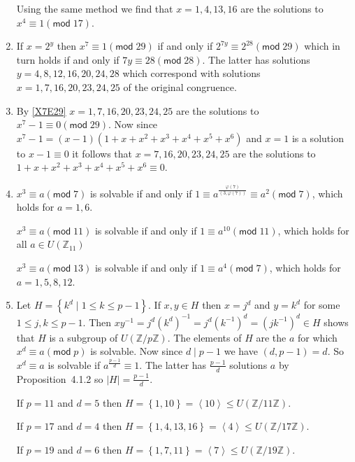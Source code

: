 \documentclass[12pt]{article}
\renewcommand{\pmod}[1]{\left(\mathsf{mod}\;#1\right)}
\begin{document}
\begin{enumerate}
Using the same method we find that $x=1,4,13,16$ are the solutions
to $x^4\equiv 1\pmod{17}$.

\item\label{X7E29} %
If $x=2^y$ then $x^7\equiv 1\pmod{29}$ if and only
if $2^{7y}\equiv 2^{28}\pmod{29}$ which in turn holds
if and only if $7y\equiv 28\pmod{28}$. The latter has solutions
$y=4,8,12,16,20,24,28$ which correspond with solutions
$x=1,7,16,20,23,24,25$ of the original congruence.

\item %
By \autoref{X7E29}
$x=1,7,16,20,23,24,25$ are the solutions to $x^7-1\equiv 0\pmod{29}$.
Now since $x^7-1=\left(x-1\right)\left(1+x+x^2+x^3+x^4+x^5+x^6\right)$
and $x=1$ is a solution to $x-1\equiv 0$ it follows that
$x=7,16,20,23,24,25$ are the solutions to 
$1+x+x^2+x^3+x^4+x^5+x^6\equiv 0$.

\item %
$x^3\equiv a\pmod{7}$ is solvable if and only if
$1\equiv a^{\frac{\varphi\left(7\right)}
{\left(3,\varphi\left(7\right)\right)}}
\equiv a^2\pmod{7}$, which holds for $a=1,6$.

$x^3\equiv a\pmod{11}$ is solvable if and only if
$1 \equiv a^{10}\pmod{11}$, which holds for all
$a\in U\left(\mathbb{Z}_{11}\right)$

$x^3\equiv a\pmod{13}$ is solvable if and only if
$1\equiv
a^4\pmod{7}$, which holds for $a=1,5,8,12$.

\item %
Let $H=\left\{k^d\mid 1\le k\le p-1\right\}$.
If $x,y\in H$ then $x=j^d$ and $y=k^d$ for some $1\le j,k\le p-1$.
Then $xy^{-1}=j^d\left(k^d\right)^{-1}
=j^d\left(k^{-1}\right)^d=\left(jk^{-1}\right)^d\in H$
shows that $H$ is a subgroup of $U\left(\mathbb{Z}/p\mathbb{Z}\right)$.
The elements of $H$ are the $a$ for which $x^d\equiv a\pmod{p}$
is solvable. Now since $d\mid p-1$ we have $\left(d,p-1\right)=d$.
So $x^d\equiv a$ is solvable if $a^{\frac{p-1}{d}}\equiv 1$.
The latter has $\frac{p-1}{d}$ solutions $a$ by Proposition~4.1.2
so $\left|H\right|=\frac{p-1}{d}$.

If $p=11$ and $d=5$ then $H=\left\{1,10\right\}
=\left\langle 10\right\rangle\le U\left(\mathbb{Z}/11\mathbb{Z}\right)$.

If $p=17$ and $d=4$ then $H=\left\{1,4,13,16\right\}
=\left\langle 4\right\rangle\le U\left(\mathbb{Z}/17\mathbb{Z}\right)$.

If $p=19$ and $d=6$ then $H=\left\{1,7,11\right\}
=\left\langle 7\right\rangle\le U\left(\mathbb{Z}/19\mathbb{Z}\right)$.


\end{enumerate}
\end{document}

